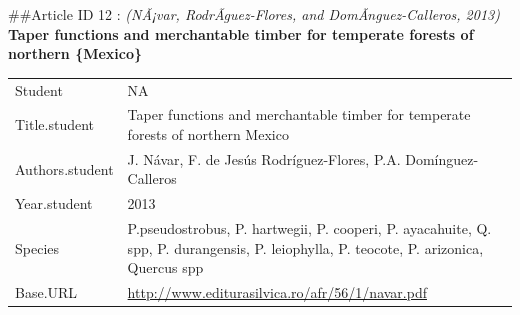 \documentclass[]{article}
\begin{document}
\#\#Article ID 12 : \emph{(NÃ¡var, RodrÃ­guez-Flores, and
DomÃ­nguez-Calleros, 2013)} \textbf{Taper functions and merchantable
timber for temperate forests of northern \{Mexico\}}

\begin{longtable}[]{@{}ll@{}}
\toprule
\endhead
\begin{minipage}[t]{0.21\columnwidth}\raggedright
Student\strut
\end{minipage} & \begin{minipage}[t]{0.73\columnwidth}\raggedright
NA\strut
\end{minipage}\tabularnewline
\begin{minipage}[t]{0.21\columnwidth}\raggedright
Title.student\strut
\end{minipage} & \begin{minipage}[t]{0.73\columnwidth}\raggedright
Taper functions and merchantable timber for temperate forests of
northern Mexico\strut
\end{minipage}\tabularnewline
\begin{minipage}[t]{0.21\columnwidth}\raggedright
Authors.student\strut
\end{minipage} & \begin{minipage}[t]{0.73\columnwidth}\raggedright
J. Návar, F. de Jesús Rodríguez-Flores, P.A. Domínguez-Calleros\strut
\end{minipage}\tabularnewline
\begin{minipage}[t]{0.21\columnwidth}\raggedright
Year.student\strut
\end{minipage} & \begin{minipage}[t]{0.73\columnwidth}\raggedright
2013\strut
\end{minipage}\tabularnewline
\begin{minipage}[t]{0.21\columnwidth}\raggedright
Species\strut
\end{minipage} & \begin{minipage}[t]{0.73\columnwidth}\raggedright
P.pseudostrobus, P. hartwegii, P. cooperi, P. ayacahuite, Q. spp, P.
durangensis, P. leiophylla, P. teocote, P. arizonica, Quercus spp\strut
\end{minipage}\tabularnewline
\begin{minipage}[t]{0.21\columnwidth}\raggedright
Base.URL\strut
\end{minipage} & \begin{minipage}[t]{0.73\columnwidth}\raggedright
\url{http://www.editurasilvica.ro/afr/56/1/navar.pdf}\strut
\end{minipage}\tabularnewline

\end{longtable}
\end{document}
